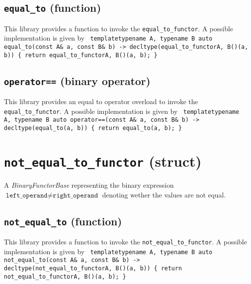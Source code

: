 \documentclass[oneside]{book}
\begin{document}
\subsection{\texttt{equal\_to} (function)}
This library provides a function to invoke the \texttt{equal\_to\_functor}.
A possible implementation is given by\newline
\texttt{
template\textlangle typename A, typename B\textrangle\newline
auto equal\_to(const A\& a, const B\& b)\newline
-> decltype(equal\_to\_functor\textlangle A, B\textrangle()(a, b))\newline
\{ return equal\_to\_functor\textlangle A, B\textrangle()(a, b); \}
}

\subsection{\texttt{operator==} (binary operator)}
This library provides an equal to operator overload to invoke the \texttt{equal\_to\_functor}.
A possible implementation is given by\newline
\texttt{
template\textlangle typename A, typename B\textrangle\newline
auto operator==(const A\& a, const B\& b)\newline
-> decltype(equal\_to(a, b))\newline
\{ return equal\_to(a, b); \}
}

\section{\texttt{not\_equal\_to\_functor} (struct)}
A \textit{BinaryFunctorBase} representing the binary expression
$\texttt{left\_operand} \neq \texttt{right\_operand}$
denoting wether the values are not equal.\newline

\subsection{\texttt{not\_equal\_to} (function)}
This library provides a function to invoke the \texttt{not\_equal\_to\_functor}.
A possible implementation is given by\newline
\texttt{
template\textlangle typename A, typename B\textrangle\newline
auto not\_equal\_to(const A\& a, const B\& b)\newline
-> decltype(not\_equal\_to\_functor\textlangle A, B\textrangle()(a, b))\newline
\{ return not\_equal\_to\_functor\textlangle A, B\textrangle()(a, b); \}
}
\end{document}

